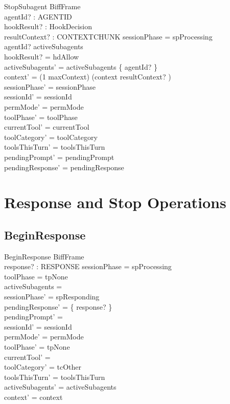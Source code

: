\documentclass[a4paper,10pt,fleqn]{article}
\begin{document}
\begin{schema}{StopSubagent}
  BiffFrame \\
  agentId? : AGENTID \\
  hookResult? : HookDecision \\
  resultContext? : CONTEXTCHUNK
  \where
  sessionPhase = spProcessing \\
  agentId? \in activeSubagents \\
  hookResult? = hdAllow \\
  activeSubagents' = activeSubagents \setminus \{ agentId? \} \\
  context' = (1 \upto maxContext) \dres (context \cat \langle resultContext? \rangle) \\
  sessionPhase' = sessionPhase \\
  sessionId' = sessionId \\
  permMode' = permMode \\
  toolPhase' = toolPhase \\
  currentTool' = currentTool \\
  toolCategory' = toolCategory \\
  toolsThisTurn' = toolsThisTurn \\
  pendingPrompt' = pendingPrompt \\
  pendingResponse' = pendingResponse
\end{schema}

\section{Response and Stop Operations}

\subsection{BeginResponse}

\begin{schema}{BeginResponse}
  BiffFrame \\
  response? : RESPONSE
  \where
  sessionPhase = spProcessing \\
  toolPhase = tpNone \\
  activeSubagents = \emptyset \\
  sessionPhase' = spResponding \\
  pendingResponse' = \{ response? \} \\
  pendingPrompt' = \emptyset \\
  sessionId' = sessionId \\
  permMode' = permMode \\
  toolPhase' = tpNone \\
  currentTool' = \emptyset \\
  toolCategory' = tcOther \\
  toolsThisTurn' = toolsThisTurn \\
  activeSubagents' = activeSubagents \\
  context' = context
\end{schema}
\end{document}
